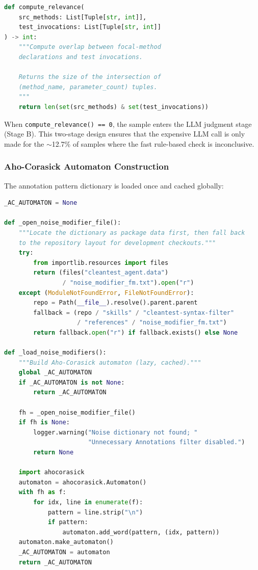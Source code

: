 \documentclass[acmlarge,nonacm,screen]{acmart}
\begin{document}
\begin{lstlisting}[language=Python,caption={Relevance computation via (name, count) overlap}]
def compute_relevance(
    src_methods: List[Tuple[str, int]],
    test_invocations: List[Tuple[str, int]]
) -> int:
    """Compute overlap between focal-method
    declarations and test invocations.

    Returns the size of the intersection of
    (method_name, parameter_count) tuples.
    """
    return len(set(src_methods) & set(test_invocations))
\end{lstlisting}

When \texttt{compute\_relevance() == 0}, the sample enters the LLM judgment stage (Stage B). This two-stage design ensures that the expensive LLM call is only made for the $\sim$12.7\% of samples where the fast rule-based check is inconclusive.

\subsubsection{Aho-Corasick Automaton Construction}

The annotation pattern dictionary is loaded once and cached globally:

\begin{lstlisting}[language=Python,caption={Lazy Aho-Corasick automaton construction}]
_AC_AUTOMATON = None

def _open_noise_modifier_file():
    """Locate the dictionary as package data first, then fall back
    to the repository layout for development checkouts."""
    try:
        from importlib.resources import files
        return (files("cleantest_agent.data")
                / "noise_modifier_fm.txt").open("r")
    except (ModuleNotFoundError, FileNotFoundError):
        repo = Path(__file__).resolve().parent.parent
        fallback = (repo / "skills" / "cleantest-syntax-filter"
                    / "references" / "noise_modifier_fm.txt")
        return fallback.open("r") if fallback.exists() else None

def _load_noise_modifiers():
    """Build Aho-Corasick automaton (lazy, cached)."""
    global _AC_AUTOMATON
    if _AC_AUTOMATON is not None:
        return _AC_AUTOMATON

    fh = _open_noise_modifier_file()
    if fh is None:
        logger.warning("Noise dictionary not found; "
                       "Unnecessary Annotations filter disabled.")
        return None

    import ahocorasick
    automaton = ahocorasick.Automaton()
    with fh as f:
        for idx, line in enumerate(f):
            pattern = line.strip("\n")
            if pattern:
                automaton.add_word(pattern, (idx, pattern))
    automaton.make_automaton()
    _AC_AUTOMATON = automaton
    return _AC_AUTOMATON
\end{lstlisting}
\end{document}
